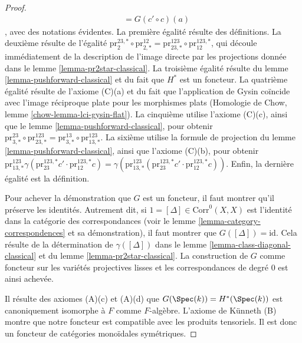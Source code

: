 \begin{proof}
\begin{align*}
& =
G(c' \circ c)(a)
\end{align*},
avec des notations évidentes. La première égalité résulte des définitions.
La deuxième résulte de l'égalité
$\text{pr}^{23, *}_2 \circ \text{pr}^{12}_{2, *} =
\text{pr}^{123}_{23, *} \circ \text{pr}^{123, *}_{12}$,
qui découle immédiatement de la description de l'image directe
par les projections donnée dans le lemme \ref{lemma-pr2star-classical}.
La troisième égalité résulte du lemme \ref{lemma-pushforward-classical}
et du fait que $H^*$ est un foncteur.
La quatrième égalité résulte de l'axiome (C)(a) et du fait que
l'application de Gysin coïncide avec l'image réciproque plate pour les morphismes plats
(Homologie de Chow, lemme \ref{chow-lemma-lci-gysin-flat}).
La cinquième utilise l'axiome (C)(c), ainsi que
le lemme \ref{lemma-pushforward-classical}, pour obtenir
$\text{pr}^{23}_{3, *} \circ \text{pr}^{123}_{23, *} =
\text{pr}^{13}_{3, *} \circ \text{pr}^{123}_{13, *}$.
La sixième utilise la formule de projection du
lemme \ref{lemma-pushforward-classical}, ainsi que
l'axiome (C)(b), pour obtenir $
\text{pr}^{123}_{13, *}
\gamma(\text{pr}^{123, *}_{23}c' \cdot \text{pr}^{123, *}_{12}c) =
\gamma(\text{pr}^{123}_{13, *}(
\text{pr}^{123, *}_{23}c' \cdot \text{pr}^{123, *}_{12}c))$.
Enfin, la dernière égalité est la définition.

\medskip\noindent
Pour achever la démonstration que $G$ est un foncteur,
il faut montrer qu'il préserve les identités. Autrement dit, si
$1 = [\Delta] \in \text{Corr}^0(X, X)$ est l'identité
dans la catégorie des correspondances (voir
le lemme \ref{lemma-category-correspondences} et sa démonstration),
il faut montrer que $G([\Delta]) = \text{id}$.
Cela résulte de la détermination de
$\gamma([\Delta])$ dans le lemme \ref{lemma-class-diagonal-classical}
et du lemme \ref{lemma-pr2star-classical}.
La construction de $G$ comme foncteur sur les
variétés projectives lisses et les correspondances de degré $0$ est ainsi achevée.

\medskip\noindent
Il résulte des axiomes (A)(c) et (A)(d) que
$G(\Spec(k)) = H^*(\Spec(k))$ est canoniquement isomorphe à $F$
comme $F$-algèbre.
L'axiome de K\"unneth (B) montre que notre foncteur est compatible avec les produits tensoriels.
Il est donc un foncteur de catégories monoïdales symétriques.


\end{proof}
